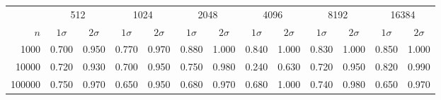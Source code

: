 \begin{tabular}{r cc cc cc cc cc cc}
\toprule
 & \multicolumn{2}{c}{512} & \multicolumn{2}{c}{1024} & \multicolumn{2}{c}{2048} & \multicolumn{2}{c}{4096} & \multicolumn{2}{c}{8192} & \multicolumn{2}{c}{16384} \\
$n$  & $1\sigma$ & $2\sigma$ & $1\sigma$ & $2\sigma$ & $1\sigma$ & $2\sigma$ & $1\sigma$ & $2\sigma$ & $1\sigma$ & $2\sigma$ & $1\sigma$ & $2\sigma$ \\
\midrule
1000 & 0.700 & 0.950 & 0.770 & 0.970 & 0.880 & 1.000 & 0.840 & 1.000 & 0.830 & 1.000 & 0.850 & 1.000 \\
10000 & 0.720 & 0.930 & 0.700 & 0.950 & 0.750 & 0.980 & 0.240 & 0.630 & 0.720 & 0.950 & 0.820 & 0.990 \\
100000 & 0.750 & 0.970 & 0.650 & 0.950 & 0.680 & 0.970 & 0.680 & 1.000 & 0.740 & 0.980 & 0.650 & 0.970 \\
\bottomrule
\end{tabular}